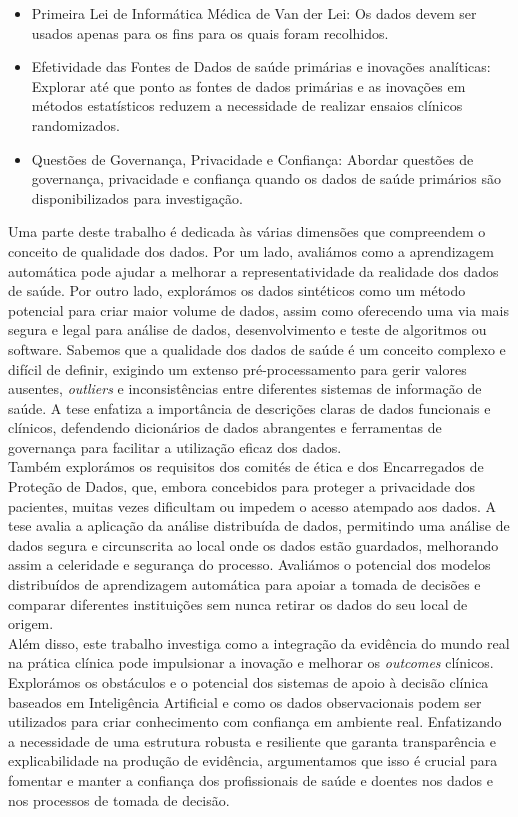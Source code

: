 \begin{itemize}
    \item Primeira Lei de Informática Médica de Van der Lei: Os dados devem ser usados apenas para os fins para os quais foram recolhidos.
    \item Efetividade das Fontes de Dados de saúde primárias e inovações analíticas: Explorar até que ponto as fontes de dados primárias e as inovações em métodos estatísticos reduzem a necessidade de realizar ensaios clínicos randomizados.
    \item Questões de Governança, Privacidade e Confiança: Abordar questões de governança, privacidade e confiança quando os dados de saúde primários são disponibilizados para investigação.

\end{itemize}

Uma parte deste trabalho é dedicada às várias dimensões que compreendem o conceito de qualidade dos dados. Por um lado, avaliámos como a aprendizagem automática pode ajudar a melhorar a representatividade da realidade dos dados de saúde. Por outro lado, explorámos os dados sintéticos como um método potencial para criar maior volume de dados, assim como oferecendo uma via mais segura e legal para análise de dados, desenvolvimento e teste de algoritmos ou software. Sabemos que a qualidade dos dados de saúde é um conceito complexo e difícil de definir, exigindo um extenso pré-processamento para gerir valores ausentes, \textit{outliers} e inconsistências entre diferentes sistemas de informação de saúde. A tese enfatiza a importância de descrições claras de dados funcionais e clínicos, defendendo dicionários de dados abrangentes e ferramentas de governança para facilitar a utilização eficaz dos dados. \\

Também explorámos os requisitos dos comités de ética e dos Encarregados de Proteção de Dados, que, embora concebidos para proteger a privacidade dos pacientes, muitas vezes dificultam ou impedem o acesso atempado aos dados. A tese avalia a aplicação da análise distribuída de dados, permitindo uma análise de dados segura e circunscrita ao local onde os dados estão guardados, melhorando assim a celeridade e segurança do processo. Avaliámos o potencial dos modelos distribuídos de aprendizagem automática para apoiar a tomada de decisões e comparar diferentes instituições sem nunca retirar os dados do seu local de origem. \\

Além disso, este trabalho investiga como a integração da evidência do mundo real na prática clínica pode impulsionar a inovação e melhorar os \textit{outcomes} clínicos. Explorámos os obstáculos e o potencial dos sistemas de apoio à decisão clínica baseados em Inteligência Artificial e como os dados observacionais podem ser utilizados para criar conhecimento com confiança em ambiente real. Enfatizando a necessidade de uma estrutura robusta e resiliente que garanta transparência e explicabilidade na produção de evidência, argumentamos que isso é crucial para fomentar e manter a confiança dos profissionais de saúde e doentes nos dados e nos processos de tomada de decisão. \\

